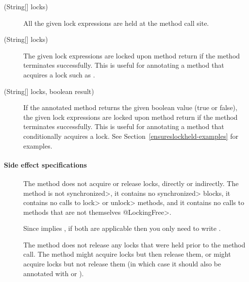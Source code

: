\begin{sloppypar}
\begin{description}
\item[\small{(String[] locks)}]
  All the given lock expressions
  are held at the method call site.

\item[\small{(String[] locks)}]
  The given lock
  expressions are
  locked upon method return if the method
  terminates successfully.  This is useful for annotating a
  method that acquires a lock such as
  .

\item[\small{(String[] locks, boolean result)}]
  If the annotated method returns the given
  boolean value (true or false), the given lock
  expressions are locked upon method return if the method
  terminates successfully.
  This is useful for annotating a
  method that conditionally acquires a lock.
  See Section~\ref{ensureslockheld-examples} for examples.

\end{description}

\paragraph{Side effect specifications\label{lock-side-effect-specifications}}

\begin{description}

\item[]
  The method does not acquire or release locks,
  directly or indirectly.  The method is not \<synchronized>, it contains
  no \<synchronized> blocks, it contains no calls to \<lock> or \<unlock>
  methods, and it contains no calls to methods that are not themselves \<@LockingFree>.

  Since
   implies , if both are applicable
  then you only need to write .

\item[]
  The method does not release any locks that were held prior
  to the method call.  The method might acquire locks but then release
  them, or might acquire locks but not release them (in which case it should
  also be annotated with
   or
  ).


\end{description}
\end{sloppypar}
